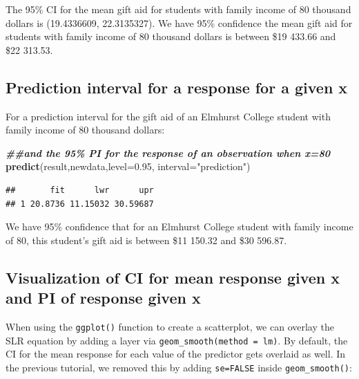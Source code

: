 \documentclass[
]{book}
\newenvironment{Shaded}{\begin{snugshade}}{\end{snugshade}}
\newcommand{\AttributeTok}[1]{\textcolor[rgb]{0.13,0.29,0.53}{#1}}
\newcommand{\DocumentationTok}[1]{\textcolor[rgb]{0.56,0.35,0.01}{\textbf{\textit{#1}}}}
\newcommand{\FloatTok}[1]{\textcolor[rgb]{0.00,0.00,0.81}{#1}}
\newcommand{\FunctionTok}[1]{\textcolor[rgb]{0.13,0.29,0.53}{\textbf{#1}}}
\newcommand{\NormalTok}[1]{#1}
\newcommand{\StringTok}[1]{\textcolor[rgb]{0.31,0.60,0.02}{#1}}
\begin{document}
The 95\% CI for the mean gift aid for students with family income of 80 thousand dollars is (19.4336609, 22.3135327). We have 95\% confidence the mean gift aid for students with family income of 80 thousand dollars is between \$19 433.66 and \$22 313.53.

\hypertarget{prediction-interval-for-a-response-for-a-given-x}{%
\subsection*{Prediction interval for a response for a given x}\label{prediction-interval-for-a-response-for-a-given-x}}

For a prediction interval for the gift aid of an Elmhurst College student with family income of 80 thousand dollars:

\begin{Shaded}
\begin{Highlighting}[]
\DocumentationTok{\#\#and the 95\% PI for the response of an observation when x=80}
\FunctionTok{predict}\NormalTok{(result,newdata,}\AttributeTok{level=}\FloatTok{0.95}\NormalTok{, }\AttributeTok{interval=}\StringTok{"prediction"}\NormalTok{)}
\end{Highlighting}
\end{Shaded}

\begin{verbatim}
##       fit      lwr      upr
## 1 20.8736 11.15032 30.59687
\end{verbatim}

We have 95\% confidence that for an Elmhurst College student with family income of 80, this student's gift aid is between \$11 150.32 and \$30 596.87.

\hypertarget{visualization-of-ci-for-mean-response-given-x-and-pi-of-response-given-x}{%
\subsection*{Visualization of CI for mean response given x and PI of response given x}\label{visualization-of-ci-for-mean-response-given-x-and-pi-of-response-given-x}}

When using the \texttt{ggplot()} function to create a scatterplot, we can overlay the SLR equation by adding a layer via \texttt{geom\_smooth(method\ =\ lm)}. By default, the CI for the mean response for each value of the predictor gets overlaid as well. In the previous tutorial, we removed this by adding \texttt{se=FALSE} inside \texttt{geom\_smooth()}:
\end{document}
